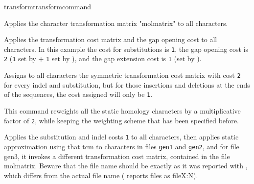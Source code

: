\begin{command}{transform}{transformcommand}
\begin{poyexamples}
           	 {Applies the character transformation matrix "molmatrix" to all
            	characters.}
            	
		
		{Applies the transformation cost matrix and the gap opening cost
		to all characters. In this example the cost for substitutions is \texttt{1},
		the gap opening cost is \texttt{2} (\texttt{1} set by 
		+ \texttt{1} set by ), and the gap extension cost is \texttt{1}
		(set by ).}
		
		{Assigns to all characters the symmetric transformation cost
		matrix with cost \texttt{2} for every indel and substitution, but for those
		insertions and deletions at the ends of the sequences, the cost
		assigned will only be \texttt{1}.}
		
            	{This command reweights all the static homology characters
            	by a multiplicative factor of \texttt{2}, while keeping the weighting
            	scheme that has been specified before.}
		
		

            	{Applies the substitution and indel costs \texttt{1} to all characters, then applies static approximation
            	using that tcm to characters in files \texttt{gen1} and \texttt{gen2}, and for file
            	gen3, it invokes a different transformation cost matrix, contained
            	in the file molmatrix. Beware that the file name should be exactly
            	as it was reported with , which differs from the actual
            	file name ( reports files as fileX:N).}


\end{poyexamples}
\end{command}
